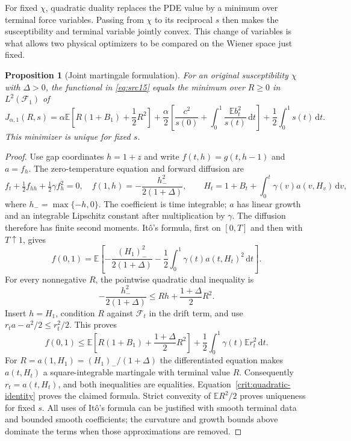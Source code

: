 \documentclass[11pt,a4paper]{article}
\numberwithin{equation}{section}
\newtheorem{proposition}[theorem]{Proposition}
\theoremstyle{definition}
\theoremstyle{remark}
\newcommand{\E}{\mathbb E}
\newcommand{\dd}{\mathrm d}
\begin{document}
For fixed $\chi$, quadratic duality replaces the PDE value by a minimum
over terminal force variables. Passing from $\chi$ to its reciprocal
$s$ then makes the susceptibility and terminal variable jointly convex.
This change of variables is what allows two physical optimizers to be
compared on the Wiener space just fixed.

\begin{proposition}[Joint martingale formulation]\label{crit:duality}
For an original susceptibility $\chi$ with $\Delta>0$, the functional in
\eqref{eq:src15} equals the minimum over $R\ge0$ in $L^2(\mathcal F_1)$ of
\begin{equation}\label{eq:src18}
 J_{\alpha,1}(R,s)
 =\alpha\E\left[R(1+B_1)+\frac12R^2\right]
   +\frac\alpha2\left[\frac{c^2}{s(0)}
          +\int_0^1\frac{\E b_t^2}{s(t)}\,\dd t\right]
   +\frac12\int_0^1s(t)\,\dd t .
\end{equation}
This minimizer is unique for fixed $s$.
\end{proposition}

\begin{proof}
Use gap coordinates $h=1+z$ and write $f(t,h)=g(t,h-1)$ and $a=f_h$.
The zero-temperature equation and forward diffusion are
\[
 f_t+\tfrac12f_{hh}+\tfrac12\gamma f_h^2=0,
 \quad f(1,h)=-\frac{h_-^2}{2(1+\Delta)},
 \qquad H_t=1+B_t+\int_0^t\gamma(v)a(v,H_v)\,\dd v,
\]
where $h_-=\max\{-h,0\}$.  The coefficient is time integrable; $a$ has
linear growth and an integrable Lipschitz constant after multiplication by
$\gamma$.  The diffusion therefore has finite second moments.  It\^o's
formula, first on $[0,T]$ and then with $T\uparrow1$, gives
\[
 f(0,1)=\E\left[-\frac{(H_1)_-^2}{2(1+\Delta)}
                    -\frac12\int_0^1\gamma(t)a(t,H_t)^2\,\dd t\right].
\]
For every nonnegative $R$, the pointwise quadratic dual inequality is
\[
 -\frac{h_-^2}{2(1+\Delta)}
       \le Rh+\frac{1+\Delta}{2}R^2.
\]
Insert $h=H_1$, condition $R$ against $\mathcal F_t$ in the drift term, and
use $r_ta-a^2/2\le r_t^2/2$.  This proves
\[
 f(0,1)\le
 \E\left[R(1+B_1)+\frac{1+\Delta}{2}R^2\right]
                 +\frac12\int_0^1\gamma(t)\E r_t^2\,\dd t.
\]
For $R=a(1,H_1)=(H_1)_-/(1+\Delta)$ the differentiated equation makes
$a(t,H_t)$ a square-integrable martingale with terminal value $R$.
Consequently $r_t=a(t,H_t)$, and both inequalities are equalities.
Equation~\eqref{crit:quadratic-identity} proves the claimed formula.
Strict convexity of $\E R^2/2$ proves uniqueness for fixed $s$.
All uses of It\^o's formula can be justified with smooth terminal data and
bounded smooth coefficients; the curvature and growth bounds above dominate
the terms when those approximations are removed.
\end{proof}
\end{document}
